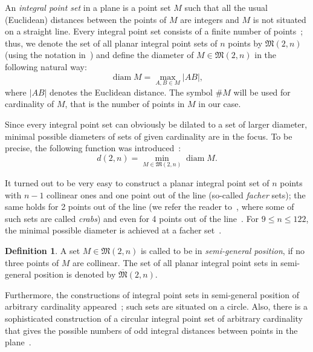 \documentclass[a4paper,14pt]{article} %
\theoremstyle{plain}
\theoremstyle{definition}
\newtheorem{definition}[theorem]{Definition}
\begin{document}
An \textit{integral point set} in a plane is a point set $M$ such that all the usual (Euclidean) distances between the
points of $M$ are integers and $M$ is not situated on a straight line.
Every integral point set consists of a finite number of points~\cite{anning1945integral,erdos1945integral};
thus, we denote the set of all planar integral point sets of $n$ points by
$\mathfrak{M}(2,n)$ (using the notation in~\cite{our-vmmsh-2018})
and define the diameter of $M\in\mathfrak{M}(2,n)$ in the following natural way:
\begin{equation}
	\operatorname{diam} M = \max_{A,B\in M} |AB|
	,
\end{equation}
where $|AB|$ denotes the Euclidean distance.
The symbol $\# M$ will be used for cardinality of $M$, that is the number of points in $M$ in our case.

Since every integral point set can obviously be dilated to a set of larger diameter,
minimal possible diameters of sets of given cardinality are in the focus.
To be precise,
the following function was introduced~\cite{kurz2008bounds,kurz2008minimum}:
\begin{equation}
	d(2,n) = \min_{M\in\mathfrak{M}(2,n)} \operatorname{diam} M
	.
\end{equation}

It turned out to be very easy to construct a planar integral point set of $n$ points with $n-1$ collinear ones and one point out of the line
(so-called \textit{facher} sets);
the same holds for 2 points out of the line (we refer the reader to~\cite{antonov2008maximal}, where some of such sets are called \textit{crabs})
and even for 4 points out of the line~\cite{huff1948diophantine}.
For $9\leq n\leq 122$, the minimal possible diameter is achieved at a facher set~\cite{kurz2008bounds}.


\begin{definition}
	A set $M\in\mathfrak{M}(2,n)$ is called to be in \textit{semi-general position},
	if no three points of $M$ are collinear.
	The set of all planar integral point sets in semi-general position
	is denoted by $\overline{\mathfrak{M}}(2,n)$.
\end{definition}

Furthermore, the constructions of integral point sets in semi-general position of arbitrary cardinality
appeared~\cite{harborth1993upper};
such sets are situated on a circle.
Also, there is a sophisticated construction of a circular integral point set of arbitrary cardinality
that gives the possible numbers of odd integral distances
between points in the plane~\cite{piepmeyer1996maximum}.
\end{document}
